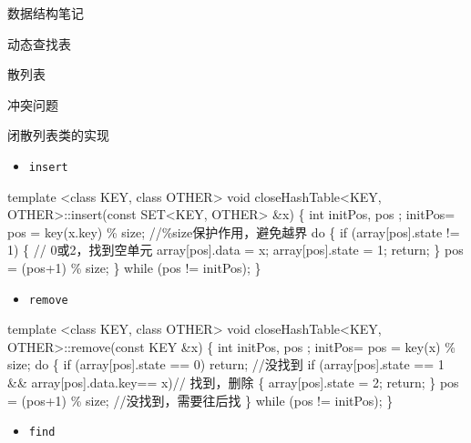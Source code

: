 \documentclass[
  ignorenonframetext,
]{beamer}
\newenvironment{Shaded}{}{}
\newcommand{\NormalTok}[1]{#1}
\providecommand{\tightlist}{%
  \setlength{\itemsep}{0pt}\setlength{\parskip}{0pt}}
\begin{document}
\begin{frame}[fragile]{数据结构笔记}
\begin{block}{动态查找表}
\begin{block}{散列表}
\begin{block}{冲突问题}
\begin{block}{闭散列表类的实现}
\begin{itemize}
\tightlist
\item
  \texttt{insert}
\end{itemize}

\begin{Shaded}
\begin{Highlighting}[]
\NormalTok{template \textless{}class KEY, class OTHER\textgreater{}}
\NormalTok{void closeHashTable\textless{}KEY, OTHER\textgreater{}::insert(const SET\textless{}KEY, OTHER\textgreater{} \&x)}
\NormalTok{\{}
\NormalTok{  int initPos, pos ;}
\NormalTok{  initPos= pos = key(x.key) \% size; //\%size保护作用，避免越界}
\NormalTok{  do}
\NormalTok{  \{}
\NormalTok{    if (array[pos].state != 1)}
\NormalTok{    \{ // 0或2，找到空单元}
\NormalTok{      array[pos].data = x;}
\NormalTok{      array[pos].state = 1;}
\NormalTok{      return;}
\NormalTok{    \}}
\NormalTok{    pos = (pos+1) \% size;}
\NormalTok{  \} while (pos != initPos);}
\NormalTok{\}}
\end{Highlighting}
\end{Shaded}

\begin{itemize}
\tightlist
\item
  \texttt{remove}
\end{itemize}

\begin{Shaded}
\begin{Highlighting}[]
\NormalTok{template \textless{}class KEY, class OTHER\textgreater{}}
\NormalTok{void closeHashTable\textless{}KEY, OTHER\textgreater{}::remove(const KEY \&x)}
\NormalTok{\{}
\NormalTok{  int initPos, pos ;}
\NormalTok{  initPos= pos = key(x) \% size;}
\NormalTok{  do}
\NormalTok{  \{}
\NormalTok{    if (array[pos].state == 0) return; //没找到}
\NormalTok{    if (array[pos].state == 1 \&\& array[pos].data.key== x)// 找到，删除}
\NormalTok{    \{}
\NormalTok{      array[pos].state = 2;}
\NormalTok{      return;}
\NormalTok{    \}}
\NormalTok{    pos = (pos+1) \% size; //没找到，需要往后找}
\NormalTok{  \} while (pos != initPos);}
\NormalTok{\}}
\end{Highlighting}
\end{Shaded}

\begin{itemize}
\tightlist
\item
  \texttt{find}
\end{itemize}


\end{block}
\end{block}
\end{block}
\end{block}
\end{frame}
\end{document}
